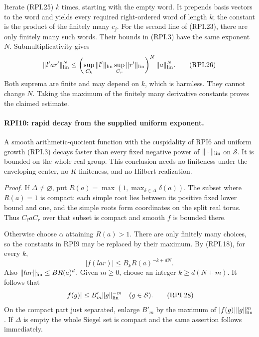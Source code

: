 Iterate (RPI.25) \(k\) times, starting with the empty
word.  It prepends basis vectors to the word and yields
every required right-ordered word of length \(k\); the
constant is the product of the finitely many \(c_j\).
For the second line of (RPI.23), there are only finitely
many such words.  Their bounds in (RPI.3) have the same
exponent \(N\).  Submultiplicativity gives
\[
 \|l'a r'\|_{\rm lin}^{N}
 \le
 \left(\sup_{C_k}\|l'\|_{\rm lin}
       \sup_{C_r}\|r'\|_{\rm lin}\right)^N
                                            \|a\|_{\rm lin}^{N}.
 \tag{RPI.26}
\]
Both suprema are finite and may depend on \(k\), which is
harmless.  They cannot change \(N\).  Taking the maximum
of the finitely many derivative constants proves the
claimed estimate.

\paragraph{RPI10: rapid decay from the supplied uniform exponent.}
\label{claim:RPI10}
A smooth arithmetic-quotient function with the cuspidality
of RPI6 and uniform growth (RPI.3) decays faster than every
fixed negative power of \(\|\cdot\|_{\rm lin}\) on
\(\mathcal S\).  It is bounded on the whole real group.
This conclusion needs no finiteness under the enveloping
center, no \(K\)-finiteness, and no Hilbert realization.

\emph{Proof.}
If \(\Delta\ne\varnothing\), put
\(R(a)=\max(1,\max_{\delta\in\Delta}\delta(a))\).
The subset where \(R(a)=1\) is compact: each simple root
lies between its positive fixed lower bound and one, and
the simple roots form coordinates on the split real torus.
Thus \(C_\ell aC_r\) over that subset is compact and
smooth \(f\) is bounded there.

Otherwise choose \(\alpha\) attaining \(R(a)>1\).
There are only finitely many choices, so the constants in
RPI9 may be replaced by their maximum.  By (RPI.18),
for every \(k\),
\[
                |f(l a r)|
                  \le B_k R(a)^{-k+dN}.
 \tag{RPI.27}
\]
Also \(\|lar\|_{\rm lin}\le B R(a)^d\).
Given \(m\ge0\), choose an integer \(k\ge d(N+m)\).
It follows that
\[
        |f(g)|\le B'_m\|g\|_{\rm lin}^{-m}
                                \quad(g\in\mathcal S).
 \tag{RPI.28}
\]
On the compact part just separated, enlarge \(B'_m\)
by the maximum of \(|f(g)|\|g\|_{\rm lin}^{m}\).
If \(\Delta\) is empty the whole Siegel set is compact
and the same assertion follows immediately.


